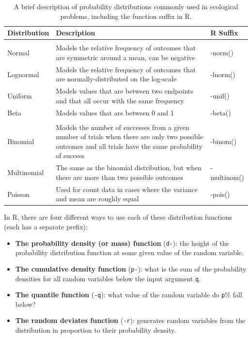 \documentclass[]{book}
\providecommand{\tightlist}{%
  \setlength{\itemsep}{0pt}\setlength{\parskip}{0pt}}
\begin{document}
\begin{table}[t]

\caption{\label{tab:dist-table-pdf}A brief description of probability distributions commonly used in ecological problems, including the function suffix in R.}
\centering
\begin{tabular}{l>{\raggedright\arraybackslash}p{20em}>{\ttfamily}l}
\toprule
\textbf{Distribution} & \textbf{Description} & \textbf{R Suffix}\\
\midrule
\addlinespace[0.3em]
\multicolumn{3}{l}{\textbf{Continuous}}\\
\hline
\hspace{1em}Normal & Models the relative frequency of outcomes that are symmetric around a mean, can be negative & -norm()\\
\hspace{1em}Lognormal & Models the relative frequency of outcomes that are normally-distributed on the log-scale & -lnorm()\\
\hspace{1em}Uniform & Models values that are between two endpoints and that all occur with the same frequency & -unif()\\
\hspace{1em}Beta & Models values that are between 0 and 1 & -beta()\\
\addlinespace[0.3em]
\multicolumn{3}{l}{\textbf{Discrete}}\\
\hline
\hspace{1em}Binomial & Models the number of successes from a given number of trials when there are only two possible outcomes and all trials have the same probability of success & -binom()\\
\hspace{1em}Multinomial & The same as the binomial distribution, but when there are more than two possible outcomes & -multinom()\\
\hspace{1em}Poisson & Used for count data in cases where the variance and mean are roughly equal & -pois()\\
\bottomrule
\end{tabular}
\end{table}

In R, there are four different ways to use each of these distribution functions (each has a separate prefix):

\begin{itemize}
\tightlist
\item
  \textbf{The probability density (or mass) function} (\texttt{d-}): the height of the probability distribution function at some given value of the random variable.
\item
  \textbf{The cumulative density function} (\texttt{p-}): what is the sum of the probability densities for all random variables below the input argument \texttt{q}.
\item
  \textbf{The quantile function} (\texttt{-q}): what value of the random variable do \texttt{p}\% fall below?
\item
  \textbf{The random deviates function} (\texttt{-r}): generates random variables from the distribution in proportion to their probability density.
\end{itemize}
\end{document}
